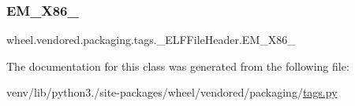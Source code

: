 \subsubsection{\texorpdfstring{E\+M\+\_\+\+X86\+\_}{EM\_X86\_64}}
{\footnotesize\ttfamily wheel.\+vendored.\+packaging.\+tags.\+\_\+\+E\+L\+F\+File\+Header.\+E\+M\+\_\+\+X86\+\_\hspace{0.3cm}{\ttfamily [static]}}



The documentation for this class was generated from the following file\+:\begin{DoxyCompactItemize}
\item 
venv/lib/python3./site-\/packages/wheel/vendored/packaging/\hyperlink{wheel_2vendored_2packaging_2tags_8py}{tags.\+py}\end{DoxyCompactItemize}
